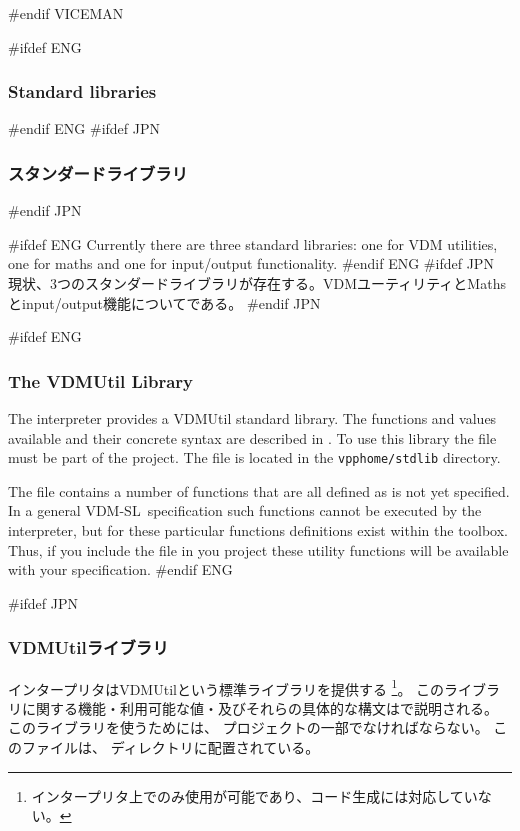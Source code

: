 \documentclass[\pformat,12pt]{article}
\newcommand{\vdmslpp}{VDM-SL}
\newcommand{\vdmslpp}{VDM++}
\newcommand{\keyw}[1]{{\sf #1}}
\begin{document}
#endif VICEMAN


#ifdef ENG
\subsubsection{Standard libraries}\label{subsec:standardlib}
#endif ENG
#ifdef JPN
\subsubsection{スタンダードライブラリ}\label{subsec:standardlib}
#endif JPN

#ifdef ENG
Currently there are three standard libraries: one for VDM utilities, 
one for maths and one
for input/output functionality.
#endif ENG
#ifdef JPN
現状、3つのスタンダードライブラリが存在する。VDMユーティリティとMathsとinput/output機能についてである。
#endif JPN

#ifdef ENG
\subsubsection*{The VDMUtil Library}
The interpreter provides a VDMUtil standard library. The functions and
values available and their concrete syntax are described in
\cite{LangMan-CSK}. To use this library the file
must be part of the project. 
The file is located in the 
{{\tt vpphome/stdlib}} directory.

The  
file contains a number of functions that are all defined as \keyw{is not yet specified}. 
In a general \vdmslpp\ specification such functions cannot be executed by the interpreter, 
but for these particular functions definitions
exist within the toolbox.  Thus, if you include the
file in you project these utility functions will be available with your specification.
#endif ENG

#ifdef JPN
\subsubsection*{VDMUtilライブラリ}
インタープリタはVDMUtilという標準ライブラリを提供する
\footnote{インタープリタ上でのみ使用が可能であり、コード生成には対応していない。}。
このライブラリに関する機能・利用可能な値・及びそれらの具体的な構文は\cite{LangMan-CSK}で説明される。
このライブラリを使うためには、
プロジェクトの一部でなければならない。
このファイルは、
ディレクトリに配置されている。
\end{document}

